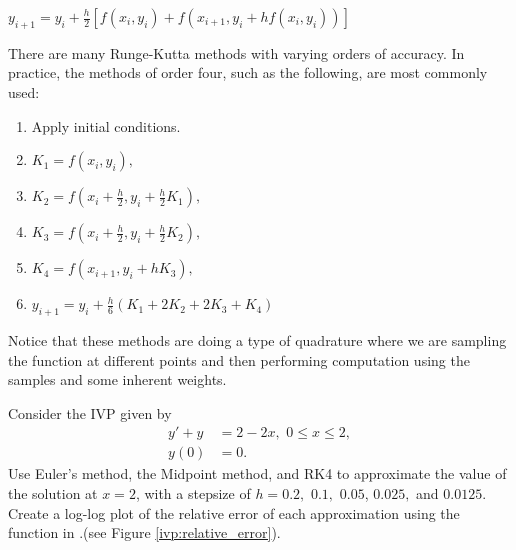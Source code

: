 $y_{i+1} = y_i + \frac{h}{2}[ f(x_i, y_i) + f(x_{i+1}, y_i+ hf(x_i, y_i))]$

There are many Runge-Kutta methods with varying orders of accuracy. In practice, the methods of order four, such as the following, are most commonly used: 
\begin{enumerate}
\item Apply initial conditions.
\item $K_1 = f(x_i,y_i),$
\item $K_2 = f(x_i + \frac{h}{2}, y_i + \frac{h}{2} K_1),$
\item $K_3 = f(x_i + \frac{h}{2} , y_i + \frac{h}{2} K_2),$
\item $K_4 = f(x_{i+1} , y_i + h K_3),$
\item $y_{i+1} = y_i + \frac{h}{6}(K_1 + 2K_2 + 2K_3 + K_4)$
\end{enumerate}

Notice that these methods are doing a type of quadrature where we are sampling the function at different points and then performing computation using the samples and some inherent weights.

\begin{problem} Consider the IVP given by 
\begin{align*}
y' + y &= 2-2x,\,\, 0 \leq x \leq 2, \\
y(0) &= 0.
\end{align*}
Use Euler's method, the Midpoint method, and RK4 to approximate the value of the solution at $x = 2$, with a stepsize of $h = 0.2,$ $ 0.1,$ $0.05 $, $0.025,$ and $0.0125.$ Create a log-log plot of the relative error of each approximation using the  function in .(see Figure \ref{ivp:relative_error}).
\end{problem}


